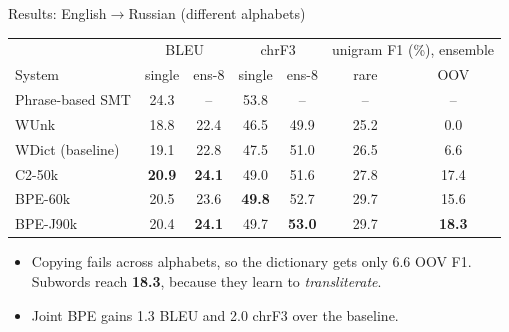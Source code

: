 \documentclass[aspectratio=169,11pt]{beamer}
\begin{document}
\begin{frame}{Results: English$\to$Russian (different alphabets)}
  \footnotesize
  \begin{tabular}{@{}lcccccc@{}}
    \toprule
    & \multicolumn{2}{c}{BLEU} & \multicolumn{2}{c}{chrF3} & \multicolumn{2}{c}{unigram F1 (\%), ensemble}\\
    System & single & ens-8 & single & ens-8 & rare & OOV\\
    \midrule
    Phrase-based SMT & 24.3 & -- & 53.8 & -- & -- & --\\
    WUnk & 18.8 & 22.4 & 46.5 & 49.9 & 25.2 & 0.0\\
    WDict (baseline) & 19.1 & 22.8 & 47.5 & 51.0 & 26.5 & 6.6\\
    C2-50k & \textbf{20.9} & \textbf{24.1} & 49.0 & 51.6 & 27.8 & 17.4\\
    BPE-60k & 20.5 & 23.6 & \textbf{49.8} & 52.7 & 29.7 & 15.6\\
    BPE-J90k & 20.4 & \textbf{24.1} & 49.7 & \textbf{53.0} & 29.7 & \textbf{18.3}\\
    \bottomrule
  \end{tabular}
  \vspace{2mm}
  \small
  \begin{itemize}
    \item Copying fails across alphabets, so the dictionary gets only 6.6 OOV F1. Subwords reach \textbf{18.3}, because they learn to \emph{transliterate}.
    \item Joint BPE gains 1.3 BLEU and 2.0 chrF3 over the baseline.
  \end{itemize}
\end{frame}
\end{document}
